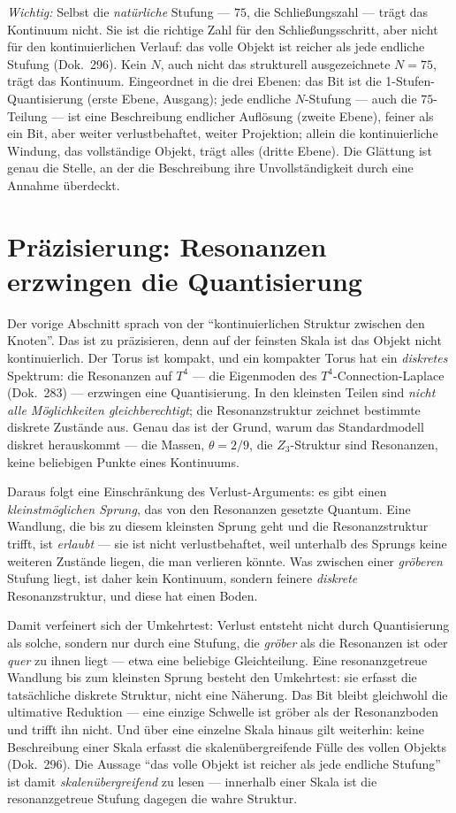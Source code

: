 \emph{Wichtig:} Selbst die \emph{natürliche} Stufung --- $75$, die
Schließungszahl --- trägt das Kontinuum nicht. Sie ist die richtige Zahl für den
Schließungsschritt, aber nicht für den kontinuierlichen Verlauf: das volle
Objekt ist reicher als jede endliche Stufung (Dok.~296). Kein $N$, auch nicht das
strukturell ausgezeichnete $N=75$, trägt das Kontinuum. Eingeordnet in die drei
Ebenen: das Bit ist die 1-Stufen-Quantisierung (erste Ebene, Ausgang); jede
endliche $N$-Stufung --- auch die $75$-Teilung --- ist eine Beschreibung endlicher
Auflösung (zweite Ebene), feiner als ein Bit, aber weiter verlustbehaftet, weiter
Projektion; allein die kontinuierliche Windung, das vollständige Objekt, trägt
alles (dritte Ebene). Die Glättung ist genau die Stelle, an der die Beschreibung
ihre Unvollständigkeit durch eine Annahme überdeckt.

\section{Präzisierung: Resonanzen erzwingen die Quantisierung}

Der vorige Abschnitt sprach von der \enquote{kontinuierlichen Struktur zwischen
den Knoten}. Das ist zu präzisieren, denn auf der feinsten Skala ist das Objekt
nicht kontinuierlich. Der Torus ist kompakt, und ein kompakter Torus hat ein
\emph{diskretes} Spektrum: die Resonanzen auf $T^4$ --- die Eigenmoden des
$T^4$-Connection-Laplace (Dok.~283) --- erzwingen eine Quantisierung. In den
kleinsten Teilen sind \emph{nicht alle Möglichkeiten gleichberechtigt}; die
Resonanzstruktur zeichnet bestimmte diskrete Zustände aus. Genau das ist der
Grund, warum das Standardmodell diskret herauskommt --- die Massen, $\theta=2/9$,
die $Z_3$-Struktur sind Resonanzen, keine beliebigen Punkte eines Kontinuums.

Daraus folgt eine Einschränkung des Verlust-Arguments: es gibt einen
\emph{kleinstmöglichen Sprung}, das von den Resonanzen gesetzte Quantum. Eine
Wandlung, die bis zu diesem kleinsten Sprung geht und die Resonanzstruktur
trifft, ist \emph{erlaubt} --- sie ist nicht verlustbehaftet, weil unterhalb des
Sprungs keine weiteren Zustände liegen, die man verlieren könnte. Was zwischen
einer \emph{gröberen} Stufung liegt, ist daher kein Kontinuum, sondern feinere
\emph{diskrete} Resonanzstruktur, und diese hat einen Boden.

Damit verfeinert sich der Umkehrtest: Verlust entsteht nicht durch Quantisierung
als solche, sondern nur durch eine Stufung, die \emph{gröber} als die Resonanzen
ist oder \emph{quer} zu ihnen liegt --- etwa eine beliebige Gleichteilung. Eine
resonanzgetreue Wandlung bis zum kleinsten Sprung besteht den Umkehrtest: sie
erfasst die tatsächliche diskrete Struktur, nicht eine Näherung. Das Bit bleibt
gleichwohl die ultimative Reduktion --- eine einzige Schwelle ist gröber als der
Resonanzboden und trifft ihn nicht. Und über eine einzelne Skala hinaus gilt
weiterhin: keine Beschreibung einer Skala erfasst die skalenübergreifende Fülle
des vollen Objekts (Dok.~296). Die Aussage \enquote{das volle Objekt ist reicher
als jede endliche Stufung} ist damit \emph{skalenübergreifend} zu lesen ---
innerhalb einer Skala ist die resonanzgetreue Stufung dagegen die wahre
Struktur.

